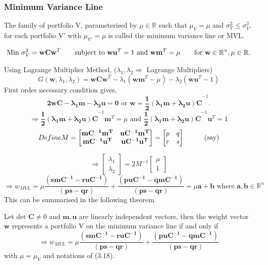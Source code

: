 \subsubsection{Minimum Variance Line}
The family of portfolio V, parameterised by $\mu \in \mathbb{R}$ such that $\mu_{V}=\mu$ and $\sigma_{V}^{2} \leq \sigma_{V'}^{2}$ for each portfolio V' with $\mu_{V'}=\mu$ is called the minimum variance line or MVL.

\begin{equation*}
    \text{Min }\sigma_{V}^2=\mathbf{wCw}^{T} \hspace{7mm} \text{subject to } \mathbf{wu}^{T}=1 \text{ and } \mathbf{wm}^{T}=\mu \hspace{7mm} \text{for }\mathbf{w} \in \mathbb{R}^{n} , \mu \in \mathbb{R}.
\end{equation*}

Using Lagrange Multiplier Method, ($\lambda_{1} , \lambda_{2} \Rightarrow$ Lagrange Multipliers)
$$G(\mathbf{w},\lambda_{1},\lambda_{2})=\mathbf{wCw}^{T}-\lambda_{1}(\mathbf{wm}^{T}-\mu)-\lambda_{2}(\mathbf{wu}^{T}-1)$$
First order necessary condition gives, $$\mathbf{2wC-\lambda_{1}m-\lambda_{2}u=0} \text{ or } \mathbf{w=\frac{1}{2}(\lambda_{1}m+\lambda_{2}u)C}^{-1}.$$
$$\Rightarrow \mathbf{\frac{1}{2}(\lambda_{1}m+\lambda_{2}u)C}^{-1}\mathbf{m}^{T}=\mu \text{ and } \mathbf{\frac{1}{2}(\lambda_{1}m+\lambda_{2}u)C}^{-1}\mathbf{u}^{T}=1$$
\begin{equation}
  Define M=\begin{bmatrix}
\mathbf{mC^{-1}m^{T}} & \mathbf{uC^{-1}m^{T}}\\
\mathbf{mC^{-1}u^{T}} & \mathbf{uC^{-1}u^{T}}
\end{bmatrix}=\begin{bmatrix}
p & q\\
r & s 
\end{bmatrix} \hspace{10mm} \text{(say)}  
\end{equation}

$$ \Rightarrow \begin{bmatrix}
\lambda_{1}\\
\lambda_{2}
\end{bmatrix}=2 M^{-1} 
\begin{bmatrix}
\mu\\
1
\end{bmatrix}$$
$$\Rightarrow w_{MVL}=\mu\mathbf{\frac{(smC^{-1}-ruC^{-1})}{(ps-qr)}}+\mathbf{\frac{(puC^{-1}-qmC^{-1})}{(ps-qr)}} = \mu\mathbf{a+b} \text{ where } \mathbf{a},\mathbf{b} \in \mathbb{R}^{n}$$
This can be summarised in the following theorem.
\newpage
\begin{theorem}
    Let det $\mathbf{C} \neq 0 \text{ and } \mathbf{m , u}$ are linearly independent vectors, then the weight vector $\mathbf{w}$ represents a portfolio V on the minimum variance line if and only if $$\Rightarrow w_{MVL}=\mu\mathbf{\frac{(smC^{-1}-ruC^{-1})}{(ps-qr)}}+\mathbf{\frac{(puC^{-1}-qmC^{-1})}{(ps-qr)}}$$ with $\mu = \mu_{V}$ and notations of (3.18).
\end{theorem}

